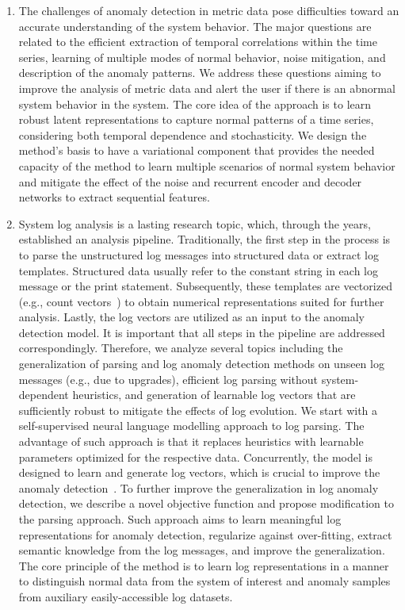 \begin{enumerate}
    \item The challenges of anomaly detection in metric data pose difficulties toward an accurate understanding of the system behavior. The major questions are related to the efficient extraction of temporal correlations within the time series, learning of multiple modes of normal behavior, noise mitigation, and description of the anomaly patterns. We address these questions aiming to improve the analysis of metric data and alert the user if there is an abnormal system behavior in the system. The core idea of the approach is to learn robust latent representations to capture normal patterns of a time series, considering both temporal dependence and stochasticity. We design the method's basis to have a variational component that provides the needed capacity of the method to learn multiple scenarios of normal system behavior and mitigate the effect of the noise and recurrent encoder and decoder networks to extract sequential features. 
    
    \item System log analysis is a lasting research topic, which, through the years, established an analysis pipeline. Traditionally, the first step in the process is to parse the unstructured log messages into structured data or extract log templates. Structured data usually refer to the constant string in each log message or the print statement. Subsequently, these templates are vectorized (e.g., count vectors~\cite{lou2010mining,xu2009detecting}) to obtain numerical representations suited for further analysis. Lastly, the log vectors are utilized as an input to the anomaly detection model. It is important that all steps in the pipeline are addressed correspondingly. Therefore, we analyze several topics including the generalization of parsing and log anomaly detection methods on unseen log messages (e.g., due to upgrades), efficient log parsing without system-dependent heuristics, and generation of learnable log vectors that are sufficiently robust to mitigate the effects of log evolution. We start with a self-supervised neural language modelling approach to log parsing. The advantage of such approach is that it replaces heuristics with learnable parameters optimized for the respective data. Concurrently, the model is designed to learn and generate log vectors, which is crucial to improve the anomaly detection~\cite{zhang2019robust}. To further improve the generalization in log anomaly detection, we describe a novel objective function and propose modification to the parsing approach. Such approach aims to learn meaningful log representations for anomaly detection, regularize against over-fitting, extract semantic knowledge from the log messages, and improve the generalization. The core principle of the method is to learn log representations in a manner to distinguish normal data from the system of interest and anomaly samples from auxiliary easily-accessible log datasets. 
    

\end{enumerate}
